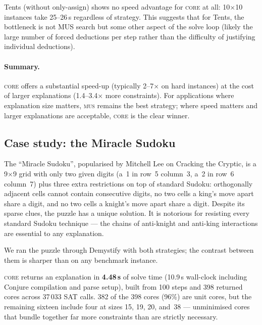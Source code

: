 Tents (without only-assign) shows no speed advantage for \textsc{core}
at all: 10$\times$10 instances take 25--26\,s regardless of strategy.
This suggests that for Tents, the bottleneck is not MUS search but
some other aspect of the solve loop (likely the large number of forced
deductions per step rather than the difficulty of justifying individual
deductions).

\paragraph{Summary.}

\textsc{core} offers a substantial speed-up (typically 2--7$\times$
on hard instances) at the cost of larger explanations
(1.4--3.4$\times$ more constraints).  For applications where
explanation size matters, \textsc{mus} remains the best strategy;
where speed matters and larger explanations are acceptable,
\textsc{core} is the clear winner.



\subsection{Case study: the Miracle Sudoku}

The ``Miracle Sudoku'', popularised by Mitchell Lee on Cracking the
Cryptic, is a 9$\times$9 grid with only two given digits (a~1 in
row~5 column~3, a~2 in row~6 column~7) plus three extra restrictions
on top of standard Sudoku: orthogonally adjacent cells cannot contain
consecutive digits, no two cells a king's move apart share a digit,
and no two cells a knight's move apart share a digit.  Despite its
sparse clues, the puzzle has a unique solution.  It is notorious for
resisting every standard Sudoku technique --- the chains of
anti-knight and anti-king interactions are essential to any
explanation.

We ran the puzzle through Demystify with both strategies; the
contrast between them is sharper than on any benchmark instance.

\textsc{core} returns an explanation in \textbf{4.48\,s} of solve
time (10.9\,s wall-clock including Conjure compilation and parse
setup), built from 100 steps and 398 returned cores across 37\,033
SAT calls.  382 of the 398 cores (96\%) are unit cores, but the
remaining sixteen include four at sizes 15, 19, 20, and~38 ---
unminimised cores that bundle together far more constraints than are
strictly necessary.


